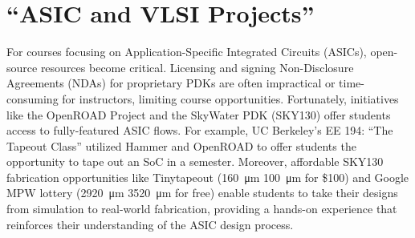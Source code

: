 \section{``ASIC and VLSI Projects''}

For courses focusing on Application-Specific Integrated Circuits (ASICs), open-source resources become critical. Licensing and signing Non-Disclosure Agreements (NDAs) for proprietary PDKs are often impractical or time-consuming for instructors, limiting course opportunities. Fortunately, initiatives like the OpenROAD Project and the SkyWater PDK (SKY130) offer students access to fully-featured ASIC flows. For example, UC Berkeley's EE 194: ``The Tapeout Class'' utilized Hammer and OpenROAD to offer students the opportunity to tape out an SoC in a semester. Moreover, affordable SKY130 fabrication opportunities like Tinytapeout (\SI{160}{\micro\metre} \texttimes \SI{100}{\micro\metre} for \$100) and Google MPW lottery (\SI{2920}{\micro\metre} \texttimes \SI{3520}{\micro\metre} for free) enable students to take their designs from simulation to real-world fabrication, providing a hands-on experience that reinforces their understanding of the ASIC design process.
